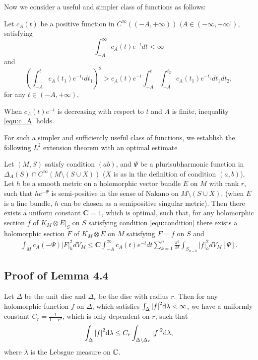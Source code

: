 \documentclass[twoside,openany,12pt]{beautynote}
\begin{document}
Now we consider a useful and simpler class of functions as follows:

Let $c_{A}(t)$ be a positive function in $C^{\infty}((-A,+\infty))$
$(A\in(-\infty,+\infty])$, satisfying
$$\int_{-A}^{\infty}c_{A}(t)e^{-t}dt<\infty$$ and
\begin{equation}
\label{equ:c_A}
\left(\int_{-A}^{t}c_{A}(t_{1})e^{-t_{1}}dt_{1}\right)^{2}>c_{A}(t)e^{-t}
\int_{-A}^{t}\int_{-A}^{t_{2}}c_{A}(t_{1})e^{-t_{1}}dt_{1}dt_{2},
\end{equation}
for any $t\in(-A,+\infty)$.

When $c_{A}(t)e^{-t}$ is decreasing with respect to $t$ and $A$ is finite, inequality \ref{equ:c_A} holds.

For such a simpler and sufficiently useful class of functions, we
establish the following $L^2$ extension theorem with an optimal
estimate
\begin{theorem}\label{t:guan-zhou-unify}
  Let $(M,S)$ satisfy condition $(ab)$, and $\Psi$ be a
plurisubharmonic function in $\Delta_{A}(S)\cap
C^{\infty}(M\setminus (S\cup X))$ ($X$ is as in the definition of
condition $(a,b)$), Let $h$ be a smooth metric on a holomorphic
vector bundle $E$ on $M$ with rank $r$, such that $he^{-\Psi}$ is
semi-positive in the sense of Nakano on $M\setminus (S\cup X)$,
(when $E$ is a line bundle, $h$ can be chosen as a semipositive
singular metric). Then there exists a uniform constant
$\mathbf{C}=1$, which is optimal, such that, for any holomorphic
section $f$ of $K_{M}\otimes E|_{S}$ on $S$ satisfying condition
\ref{equ:condition}  there exists a holomorphic section $F$ of
$K_{M}\otimes E$ on $M$ satisfying $F = f$ on $ S$ and
\begin{eqnarray*}
\int_{M}c_{A}(-\Psi)|F|^{2}_{h}dV_{M}
\leq\mathbf{C}\int_{-A}^{\infty}c_{A}(t)e^{-t}dt\sum_{k=1}^{n}\frac{\pi^{k}}{k!}\int_{S_{n-k}}|f|^{2}_{h}dV_{M}[\Psi].
\end{eqnarray*}
\end{theorem}

\subsection{Proof of Lemma 4.4}

\begin{lemma}
Let $\Delta$ be the unit disc and $\Delta_r$ be the disc with radius $r$. Then for any holomorphic function $f$ on $\Delta$, which satisfies $\int_\Delta \abs{f}^2 \dd \lambda<\infty$, we have a uniformly constant $C_r=\frac{1}{1-r^2}$, which is only dependent on $r$, such that \[\int_\Delta \abs{f}^2\dd \lambda\leq C_r \int_{\Delta\backslash \Delta_r}\abs{f}^2\dd \lambda,\]
where $\lambda$ is the Lebsgue measure on ${\mathbb C}$.
\end{lemma}
\end{document}
